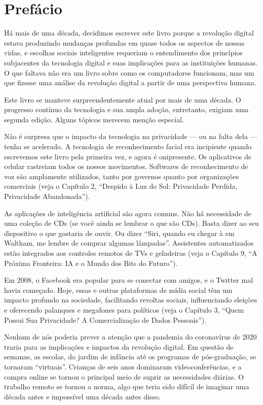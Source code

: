 \chapter{Prefácio}
\label{chap:prefacio}

Há mais de uma década, decidimos escrever este livro porque a revolução digital
estava produzindo mudanças profundas em quase todos os aspectos de nossas vidas,
e escolhas sociais inteligentes requeriam o entendimento dos princípios
subjacentes da tecnologia digital e suas implicações para as instituições
humanas. O que faltava não era um livro sobre como os computadores funcionam,
mas um que fizesse uma análise da revolução digital a partir de uma perspectiva
humana.

Este livro se manteve surpreendentemente atual por mais de uma década. O
progresso contínuo da tecnologia e sua ampla adoção, entretanto, exigiam uma
segunda edição. Alguns tópicos merecem menção especial.

Não é surpresa que o impacto da tecnologia na privacidade --- ou na falta dela
--- tenha se acelerado. A tecnologia de reconhecimento facial era incipiente
quando escrevemos este livro pela primeira vez, e agora é onipresente. Os
aplicativos de celular rastreiam todos os nossos movimentos. Softwares de
reconhecimento de voz são amplamente utilizados, tanto por governos quanto por
organizações comerciais (veja o Capítulo 2, ``Despido à Luz do Sol: Privacidade
Perdida, Privacidade Abandonada'').

As aplicações de inteligência artificial são agora comuns. Não há necessidade de
uma coleção de CDs (se você ainda se lembrar o que são CDs). Basta dizer ao seu
dispositivo o que gostaria de ouvir. Ou dizer ``Siri, quando eu chegar à
 em Waltham, me lembre de comprar algumas
lâmpadas''. Assistentes automatizados estão integrados aos controles remotos de
TVs e geladeiras (veja o Capítulo 9, ``A Próxima Fronteira: IA e o Mundo dos
Bits do Futuro'').

Em 2008, o Facebook era popular para se conectar com amigos, e o Twitter mal
havia começado. Hoje, essas e outras plataformas de mídia social têm um impacto
profundo na sociedade, facilitando revoltas sociais, influenciando eleições e
oferecendo palanques e megafones para políticos (veja o Capítulo 3, ``Quem
Possui Sua Privacidade? A Comercialização de Dados Pessoais'').

Nenhum de nós poderia prever a atenção que a pandemia do coronavírus de 2020
traria para as implicações e impactos da revolução digital. Em questão de
semanas, as escolas, do jardim de infância até os programas de
pós-graduação, se tornaram ``virtuais''. Crianças de seis anos dominaram
videoconferências, e a compra online se tornou o principal meio de suprir as
necessidades diárias. O trabalho remoto se tornou a norma, algo que teria sido
difícil de imaginar uma década antes e impossível uma década antes disso.

